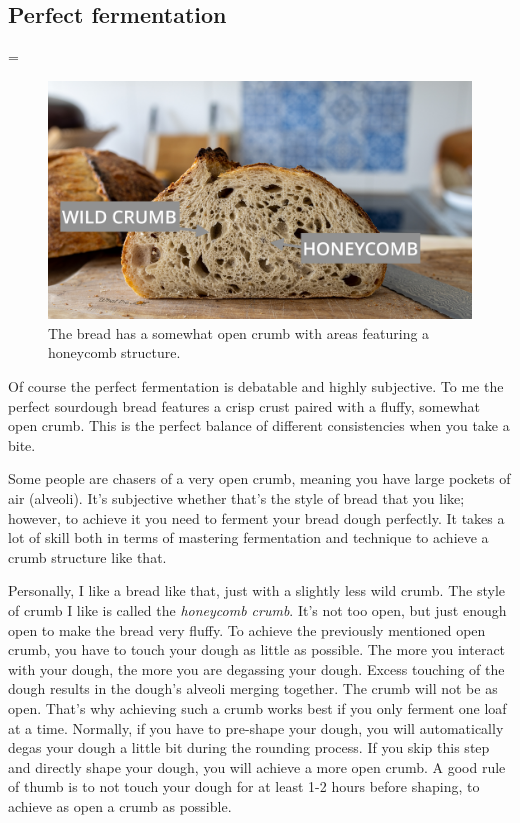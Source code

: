 \subsection{Perfect fermentation}=

\begin{figure}
  \includegraphics[width=\textwidth]{open-crumb}
  \caption{The bread has a somewhat open crumb with areas
  featuring a honeycomb structure.}
  \label{fig:open-crumb}
\end{figure}

Of course the perfect fermentation is debatable and highly subjective. To
me the perfect sourdough bread features a crisp crust paired with a fluffy,
somewhat open crumb. This is the perfect balance of different consistencies
when you take a bite.

Some people are chasers of a very open crumb, meaning you have large pockets
of air (alveoli). It's subjective whether that's the style of bread that you like;
however, to achieve it you need to ferment your bread dough perfectly.
It takes a lot of skill both in terms of mastering fermentation and technique
to achieve a crumb structure like that.

Personally, I like a bread like that, just with a slightly less wild crumb.
The style of crumb I like is called the {\it honeycomb crumb}. It's not too open, but
just enough open to make the bread very fluffy. To achieve the previously mentioned open crumb, you
have to touch your dough as little as possible. The more you interact with your
dough, the more you are degassing your dough. Excess touching of the dough
results in the dough's alveoli merging together. The crumb will not be as open.
That's why achieving such a crumb works best if you only ferment
one loaf at a time. Normally, if you have to pre-shape your dough,
you will automatically degas your dough a little bit during the rounding process.
If you skip this step and directly shape your dough, you will achieve a more open crumb.
A good rule of thumb is to not touch your dough for at least 1-2 hours before shaping,
to achieve as open a crumb as possible.

